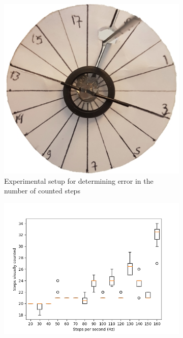 \begin{figure}
	\centering
	\begin{subfigure}[b]{0.38\textwidth}
		\includegraphics[width=\textwidth]{pics/step_counting.jpg}
		\caption{Experimental setup for determining error in the number of counted steps}
		\label{fig:step_counting}
	\end{subfigure}	
	\quad
	\begin{subfigure}[b]{0.55\textwidth}
		\includegraphics[width=\textwidth]{pics/figure_intertia.png}
		\caption{}
		\label{fig:step_results}
	\end{subfigure}
	\caption{}
\end{figure}

